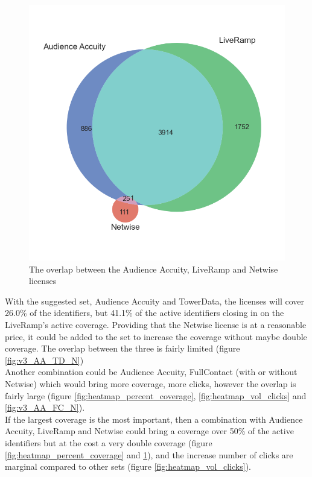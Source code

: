 \documentclass[11pt]{article} %
\begin{document}
\begin{figure}[h!]
  \includegraphics[width=0.48\linewidth]{../outputs/venn3_Audience Accuity_LiveRamp_Netwise.png}
  \caption{The overlap between the Audience Accuity, LiveRamp and Netwise licenses}
  \label{fig:v3_AA_LR_N}
\end{figure}

With the suggested set, Audience Accuity and TowerData, the licenses will cover 26.0\% of the identifiers, but 41.1\% of the active identifiers closing in on the LiveRamp's active coverage. Providing that the Netwise license is at a reasonable price, it could be added to the set to increase the coverage without maybe double coverage. The overlap between the three is fairly limited (figure \ref{fig:v3_AA_TD_N})\\

Another combination could be Audience Accuity, FullContact (with or without Netwise) which would bring more coverage, more clicks, however the overlap is fairly large (figure \ref{fig:heatmap_percent_coverage}, \ref{fig:heatmap_vol_clicks} and \ref{fig:v3_AA_FC_N}).\\

If the largest coverage is the most important, then a combination with Audience Accuity, LiveRamp and Netwise could bring a coverage over 50\% of the active identifiers but at the cost a very double coverage (figure \ref{fig:heatmap_percent_coverage}  and \ref{fig:v3_AA_LR_N}), and the increase number of clicks are marginal compared to other sets (figure \ref{fig:heatmap_vol_clicks}).
\end{document}
